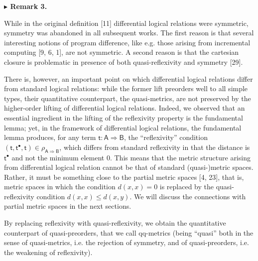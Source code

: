 \documentclass[10pt,a4paper]{amsart}
\begin{document}
 
 
\par\medskip\noindent\textbf{$\blacktriangleright$ Remark 3.}\par
 
 
While in the original definition [11] differential logical relations were symmetric, symmetry was abandoned in all subsequent works. The first reason is that several interesting notions of program difference, like e.g. those arising from incremental computing [9, 6, 1], are not symmetric. A second reason is that the cartesian closure is problematic in presence of both quasi-reflexivity and symmetry [29].\par
 
 
 
 
There is, however, an important point on which differential logical relations differ from standard logical relations: while the former lift preorders well to all simple types, their quantitative counterpart, the quasi-metrics, are not preserved by the higher-order lifting of differential logical relations. Indeed, we observed that an essential ingredient in the lifting of the reflexivity property is the fundamental lemma; yet, in the framework of differential logical relations, the fundamental lemma produces, for any term $\mathsf{t}:\mathsf{A}\Rightarrow\mathsf{B}$, the “reflexivity” condition $(\mathsf{t},{\mathsf{t}}^{\bullet},\mathsf{t})\in\rho_{\mathsf{A}\Rightarrow%
\mathsf{B}}$, which differs from standard reflexivity in that the distance is ${\mathsf{t}}^{\bullet}$ and not the minimum element $0$. This means that the metric structure arising from differential logical relation cannot be that of standard (quasi-)metric spaces. Rather, it must be something close to the partial metric spaces [4, 23], that is, metric spaces in which the condition $d(x,x)=0$ is replaced by the quasi-reflexivity condition $d(x,x)\leq d(x,y)$. We will discuss the connections with partial metric spaces in the next sections.\par
 
 
 
By replacing reflexivity with quasi-reflexivity, we obtain the quantitative counterpart of quasi-preorders, that we call qq-metrics (being “quasi” both in the sense of quasi-metrics, i.e. the rejection of symmetry, and of quasi-preorders, i.e. the weakening of reflexivity).\par
 
\end{document}
